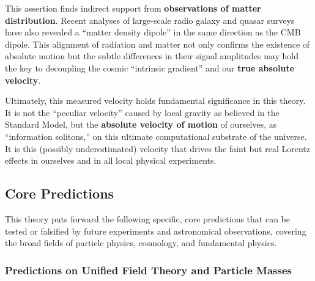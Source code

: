 \documentclass[11pt, a4paper]{article}
\begin{document}
This assertion finds indirect support from \textbf{observations of matter distribution}. Recent analyses of large-scale radio galaxy and quasar surveys have also revealed a ``matter density dipole'' in the same direction as the CMB dipole. This alignment of radiation and matter not only confirms the existence of absolute motion but the subtle differences in their signal amplitudes may hold the key to decoupling the cosmic ``intrinsic gradient'' and our \textbf{true absolute velocity}.

Ultimately, this measured velocity holds fundamental significance in this theory. It is not the ``peculiar velocity'' caused by local gravity as believed in the Standard Model, but the \textbf{absolute velocity of motion} of ourselves, as ``information solitons,'' on this ultimate computational substrate of the universe. It is this (possibly underestimated) velocity that drives the faint but real Lorentz effects in ourselves and in all local physical experiments.


\subsection{Core Predictions}

This theory puts forward the following specific, core predictions that can be tested or falsified by future experiments and astronomical observations, covering the broad fields of particle physics, cosmology, and fundamental physics.

\subsubsection{Predictions on Unified Field Theory and Particle Masses}
\end{document}

